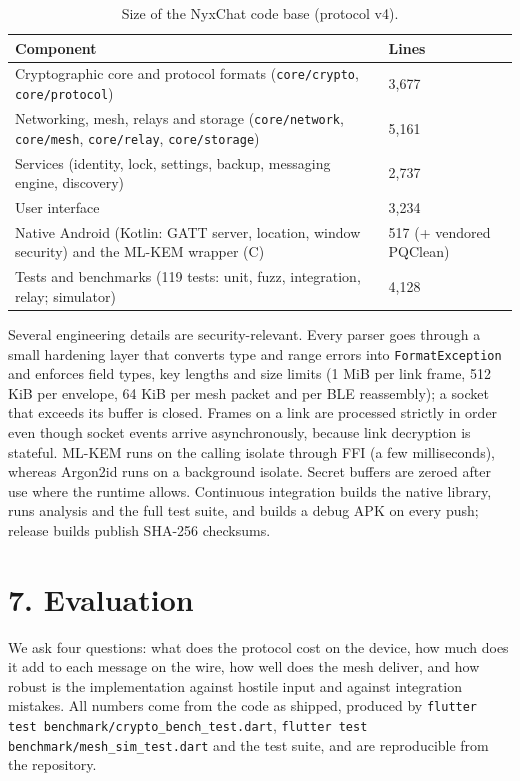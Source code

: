 \documentclass[conference]{IEEEtran}
\begin{document}
\begin{table}[t]\centering\footnotesize
\caption{Size of the NyxChat code base (protocol v4).}
\begin{tabular}{ll}\toprule
Component & Lines \\ \midrule
Cryptographic core and protocol formats (\texttt{core/crypto}, \texttt{core/protocol}) & 3,677 \\
Networking, mesh, relays and storage (\texttt{core/network}, \texttt{core/mesh}, \texttt{core/relay}, \texttt{core/storage}) & 5,161 \\
Services (identity, lock, settings, backup, messaging engine, discovery) & 2,737 \\
User interface & 3,234 \\
Native Android (Kotlin: GATT server, location, window security) and the ML-KEM wrapper (C) & 517 (+ vendored PQClean) \\
Tests and benchmarks (119 tests: unit, fuzz, integration, relay; simulator) & 4,128 \\
\bottomrule\end{tabular}\end{table}
Several engineering details are security-relevant. Every parser goes through a small hardening layer that converts type and range errors into \texttt{FormatException} and enforces field types, key lengths and size limits (1 MiB per link frame, 512 KiB per envelope, 64 KiB per mesh packet and per BLE reassembly); a socket that exceeds its buffer is closed. Frames on a link are processed strictly in order even though socket events arrive asynchronously, because link decryption is stateful. ML-KEM runs on the calling isolate through FFI (a few milliseconds), whereas Argon2id runs on a background isolate. Secret buffers are zeroed after use where the runtime allows. Continuous integration builds the native library, runs analysis and the full test suite, and builds a debug APK on every push; release builds publish SHA-256 checksums.

\section{7. Evaluation}
We ask four questions: what does the protocol cost on the device, how much does it add to each message on the wire, how well does the mesh deliver, and how robust is the implementation against hostile input and against integration mistakes. All numbers come from the code as shipped, produced by \texttt{flutter test benchmark/crypto\_bench\_test.dart}, \texttt{flutter test benchmark/mesh\_sim\_test.dart} and the test suite, and are reproducible from the repository.
\end{document}

